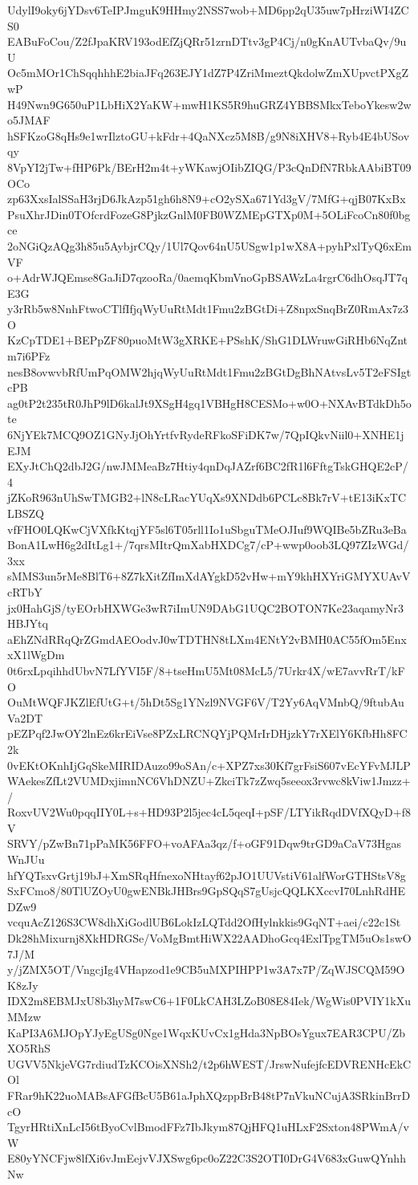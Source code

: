 UdylI9oky6jYDsv6TeIPJmguK9HHmy2NSS7wob+MD6pp2qU35uw7pHrziWI4ZCS0
EABuFoCou/Z2fJpaKRV193odEfZjQRr51zrnDTtv3gP4Cj/n0gKnAUTvbaQv/9uU
Oc5mMOr1ChSqqhhhE2biaJFq263EJY1dZ7P4ZriMmeztQkdolwZmXUpvctPXgZwP
H49Nwn9G650uP1LbHiX2YaKW+mwH1KS5R9huGRZ4YBBSMkxTeboYkesw2wo5JMAF
hSFKzoG8qHs9e1wrIlztoGU+kFdr+4QaNXcz5M8B/g9N8iXHV8+Ryb4E4bUSovqy
8VpYI2jTw+fHP6Pk/BErH2m4t+yWKawjOIibZIQG/P3cQnDfN7RbkAAbiBT09OCo
zp63XxsIalSSaH3rjD6JkAzp51gh6h8N9+cO2ySXa671Yd3gV/7MfG+qjB07KxBx
PsuXhrJDin0TOfcrdFozeG8PjkzGnlM0FB0WZMEpGTXp0M+5OLiFcoCn80f0bgce
2oNGiQzAQg3h85u5AybjrCQy/1Ul7Qov64nU5USgw1p1wX8A+pyhPxlTyQ6xEmVF
o+AdrWJQEmse8GaJiD7qzooRa/0aemqKbmVnoGpBSAWzLa4rgrC6dhOsqJT7qE3G
y3rRb5w8NnhFtwoCTlfIfjqWyUuRtMdt1Fmu2zBGtDi+Z8npxSnqBrZ0RmAx7z3O
KzCpTDE1+BEPpZF80puoMtW3gXRKE+PSshK/ShG1DLWruwGiRHb6NqZntm7i6PFz
nesB8ovwvbRfUmPqOMW2hjqWyUuRtMdt1Fmu2zBGtDgBhNAtvsLv5T2eFSIgtcPB
ag0tP2t235tR0JhP9lD6kalJt9XSgH4gq1VBHgH8CESMo+w0O+NXAvBTdkDh5ote
6NjYEk7MCQ9OZ1GNyJjOhYrtfvRydeRFkoSFiDK7w/7QpIQkvNiil0+XNHE1jEJM
EXyJtChQ2dbJ2G/nwJMMeaBz7Htiy4qnDqJAZrf6BC2fR1l6FftgTskGHQE2cP/4
jZKoR963nUhSwTMGB2+lN8cLRacYUqXs9XNDdb6PCLc8Bk7rV+tE13iKxTCLBSZQ
vfFHO0LQKwCjVXfkKtqjYF5sl6T05rll1Io1uSbguTMeOJIuf9WQIBe5bZRu3eBa
BonA1LwH6g2dItLg1+/7qrsMItrQmXabHXDCg7/cP+wwp0oob3LQ97ZIzWGd/3xx
sMMS3un5rMe8BlT6+8Z7kXitZfImXdAYgkD52vHw+mY9khHXYriGMYXUAvVcRTbY
jx0HahGjS/tyEOrbHXWGe3wR7iImUN9DAbG1UQC2BOTON7Ke23aqamyNr3HBJYtq
aEhZNdRRqQrZGmdAEOodvJ0wTDTHN8tLXm4ENtY2vBMH0AC55fOm5EnxxX1lWgDm
0t6rxLpqihhdUbvN7LfYVI5F/8+tseHmU5Mt08McL5/7Urkr4X/wE7avvRrT/kFO
OuMtWQFJKZlEfUtG+t/5hDt5Sg1YNzl9NVGF6V/T2Yy6AqVMnbQ/9ftubAuVa2DT
pEZPqf2JwOY2lnEz6krEiVse8PZxLRCNQYjPQMrIrDHjzkY7rXElY6KfbHh8FC2k
0vEKtOKnhIjGqSkeMIRIDAuzo99oSAn/c+XPZ7xs30Kf7grFsiS607vEcYFvMJLP
WAekesZfLt2VUMDxjimnNC6VhDNZU+ZkciTk7zZwq5seeox3rvwc8kViw1Jmzz+/
RoxvUV2Wu0pqqIIY0L+s+HD93P2l5jec4cL5qeqI+pSF/LTYikRqdDVfXQyD+f8V
SRVY/pZwBn71pPaMK56FFO+voAFAa3qz/f+oGF91Dqw9trGD9aCaV73HgasWnJUu
hfYQTsxvGrtj19bJ+XmSRqHfnexoNHtayf62pJO1UUVstiV61alfWorGTHStsV8g
SxFCmo8/80TlUZOyU0gwENBkJHBrs9GpSQqS7gUsjcQQLKXccvI70LnhRdHEDZw9
vcquAcZ126S3CW8dhXiGodlUB6LokIzLQTdd2OfHylnkkis9GqNT+aei/c22c1St
Dk28hMixurnj8XkHDRGSe/VoMgBmtHiWX22AADhoGcq4ExlTpgTM5uOs1swO7J/M
y/jZMX5OT/VngcjIg4VHapzod1e9CB5uMXPIHPP1w3A7x7P/ZqWJSCQM59OK8zJy
IDX2m8EBMJxU8b3hyM7swC6+1F0LkCAH3LZoB08E84Iek/WgWis0PVIY1kXuMMzw
KaPI3A6MJOpYJyEgUSg0Nge1WqxKUvCx1gHda3NpBOsYgux7EAR3CPU/ZbXO5RhS
UGVV5NkjeVG7rdiudTzKCOisXNSh2/t2p6hWEST/JrswNufejfcEDVRENHcEkCOl
FRar9hK22uoMABsAFGfBcU5B61aJphXQzppBrB48tP7nVkuNCujA3SRkinBrrDcO
TgyrHRtiXnLcI56tByoCvlBmodFFz7IbJkym87QjHFQ1uHLxF2Sxton48PWmA/vW
E80yYNCFjw8lfXi6vJmEejvVJXSwg6pc0oZ22C3S2OTI0DrG4V683xGuwQYnhhNw
